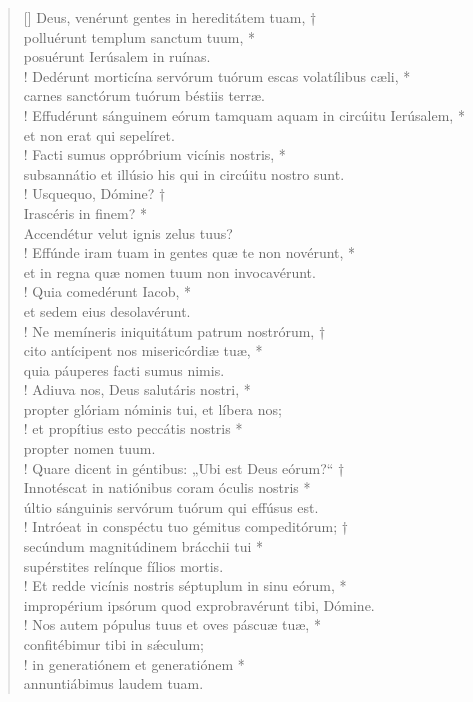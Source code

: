 \begin{verse}[\versewidth]
Deus, venérunt gentes in hereditátem tuam, †\\
polluérunt templum sanctum tuum, *\\
posuérunt Ierúsalem in ruínas.\\!
\vin Dedérunt morticína \verselinebreak servórum tuórum escas volatílibus cæli, *\\
\vin carnes sanctórum tuórum béstiis terræ.\\!
Effudérunt sánguinem \verselinebreak eórum tamquam aquam in circúitu Ierúsalem, *\\
et non erat qui sepelíret.\\!
\vin Facti sumus oppróbrium vicínis nostris, *\\
\vin subsannátio et illúsio his qui in circúitu nostro sunt.\\!
Usquequo, Dómine? †\\
Irascéris in finem? *\\
Accendétur velut ignis zelus tuus?\\!
\vin Effúnde iram tuam in gentes quæ te non novérunt, *\\
\vin et in regna quæ nomen tuum non invocavérunt.\\!
Quia comedérunt Iacob, *\\
et sedem eius desolavérunt.\\!
\vin Ne memíneris iniquitátum patrum nostrórum, †\\
\vin cito antícipent nos misericórdiæ tuæ, *\\
\vin quia páuperes facti sumus nimis.\\!
Adiuva nos, Deus salutáris nostri, *\\
propter glóriam nóminis tui, et líbera nos;\\!
\vin et propítius esto peccátis nostris *\\
\vin propter nomen tuum.\\!
Quare dicent in géntibus: „Ubi est Deus eórum?“ †\\
Innotéscat in natiónibus coram óculis nostris *\\
últio sánguinis servórum tuórum qui effúsus est.\\!
\vin Intróeat in conspéctu tuo gémitus compeditórum; †\\
\vin secúndum magnitúdinem brácchii tui *\\
\vin supérstites relínque fílios mortis.\\!
Et redde vicínis nostris séptuplum in sinu eórum, *\\
impropérium ipsórum quod exprobravérunt tibi, Dómine.\\!
\vin Nos autem pópulus tuus et oves páscuæ tuæ, *\\
\vin confitébimur tibi in s\'{æ}culum;\\!
in generatiónem et generatiónem *\\
annuntiábimus laudem tuam.\\
\end{verse}
\vspace{1cm}


